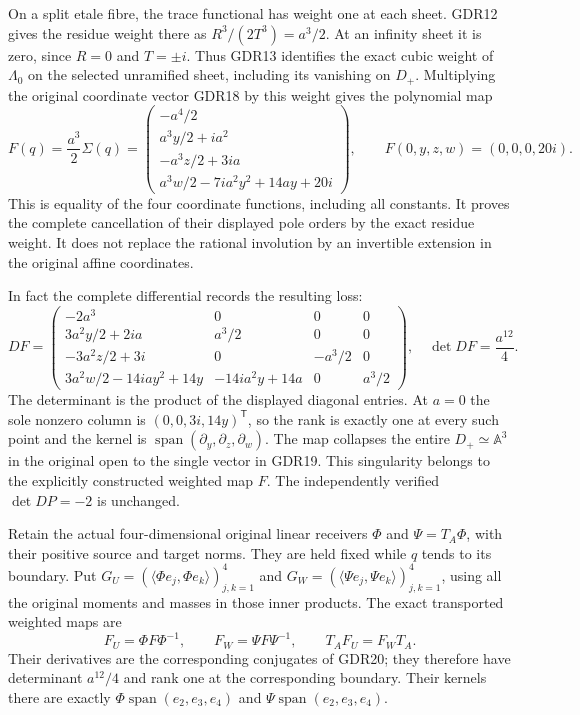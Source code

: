 \documentclass[10pt]{article}
\begin{document}
On a split etale fibre, the trace functional has weight one
at each sheet. GDR12 gives the residue weight there as
$R^3/(2T^3)=a^3/2$. At an infinity sheet it is zero, since
$R=0$ and $T=\pm i$. Thus GDR13 identifies the exact cubic
weight of $\Lambda_0$ on the selected unramified sheet,
including its vanishing on $D_+$.
Multiplying the original coordinate vector GDR18 by this
weight gives the polynomial map
\begin{equation}
 F(q)=\frac{a^3}{2}\Sigma(q)=
 \begin{pmatrix}
 -a^4/2\\a^3y/2+ia^2\\-a^3z/2+3ia\\
 a^3w/2-7ia^2y^2+14ay+20i
 \end{pmatrix},\qquad
 F(0,y,z,w)=(0,0,0,20i).
 \tag{GDR19}
\end{equation}
This is equality of the four coordinate functions, including
all constants. It proves the complete cancellation of their
displayed pole orders by the exact residue weight. It does not
replace the rational involution by an invertible extension in
the original affine coordinates.

In fact the complete differential records the resulting loss:
\begin{equation}
 DF=\begin{pmatrix}
 -2a^3&0&0&0\\
 3a^2y/2+2ia&a^3/2&0&0\\
 -3a^2z/2+3i&0&-a^3/2&0\\
 3a^2w/2-14iay^2+14y&-14ia^2y+14a&0&a^3/2
 \end{pmatrix},
 \quad\det DF=\frac{a^{12}}4.
 \tag{GDR20}
\end{equation}
The determinant is the product of the displayed diagonal
entries. At $a=0$ the sole nonzero column is
$(0,0,3i,14y)^{\mathsf T}$, so the rank is exactly one
at every such point and the kernel is
$\operatorname{span}(\partial_y,\partial_z,\partial_w)$.
The map collapses the entire $D_+\simeq\mathbb A^3$ in the
original open to the single vector in GDR19. This singularity
belongs to the explicitly constructed weighted map $F$.
The independently verified $\det DP=-2$ is unchanged.

Retain the actual four-dimensional original linear receivers
$\Phi$ and $\Psi=T_A\Phi$, with their positive source and
target norms. They are held fixed while $q$ tends to its
boundary. Put
$G_U=(\langle\Phi e_j,\Phi e_k\rangle)_{j,k=1}^4$ and
$G_W=(\langle\Psi e_j,\Psi e_k\rangle)_{j,k=1}^4$,
using all the original moments and masses in those inner
products. The exact transported weighted maps are
\begin{equation}
 F_U=\Phi F\Phi^{-1},\qquad F_W=\Psi F\Psi^{-1},\qquad
 T_AF_U=F_WT_A.
 \tag{GDR21}
\end{equation}
Their derivatives are the corresponding conjugates of GDR20;
they therefore have determinant $a^{12}/4$ and rank one at
the corresponding boundary. Their kernels there are exactly
$\Phi\operatorname{span}(e_2,e_3,e_4)$ and
$\Psi\operatorname{span}(e_2,e_3,e_4)$.
\end{document}
